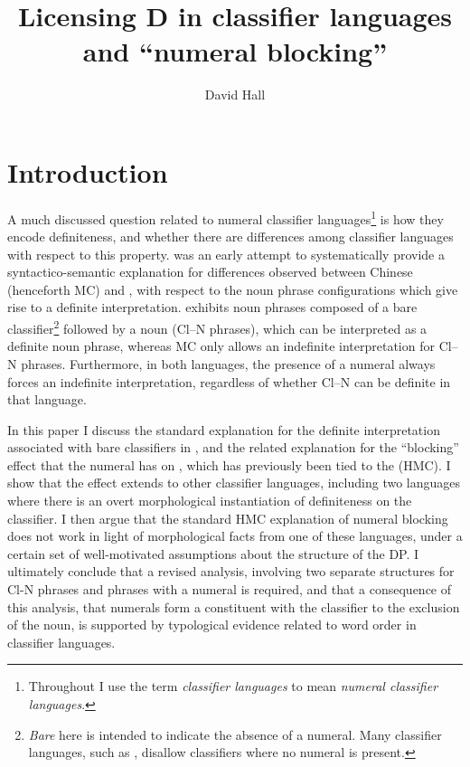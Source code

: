 \documentclass[output=paper
,modfonts
,nonflat]{langsci/langscibook}
\title{Licensing D in classifier languages and ``numeral blocking''}
\author{%
	David Hall\affiliation{Queen Mary University of London}
}
\begin{document}
\maketitle\settowidth\jamwidth{}

\section{Introduction}

A much discussed question related to numeral classifier languages\footnote{Throughout I use the term \textit{classifier languages} to mean \textit{numeral classifier languages}.} is how they encode definiteness, and whether there are differences among classifier languages with respect to this property. \citet{ChengSybesma1999} was an early attempt to systematically provide a syntactico-semantic explanation for differences observed between  Chinese (henceforth MC) and , with respect to the noun phrase configurations which give rise to a definite interpretation.  exhibits noun phrases composed of a bare classifier\footnote{\textit{Bare} here is intended to indicate the absence of a numeral. Many classifier languages, such as , disallow classifiers where no numeral is present.} followed by a noun (Cl--N phrases), which can be interpreted as a definite noun phrase, whereas MC only allows an indefinite interpretation for Cl--N phrases. Furthermore, in both languages, the presence of a numeral always forces an indefinite interpretation, regardless of whether Cl--N can be definite in that language. 

In this paper I discuss the standard explanation for the definite interpretation associated with bare classifiers in , and the related explanation for the ``blocking'' effect that the numeral has on , which has previously been tied to the  (HMC). I show that the  effect extends to other classifier languages, including two languages where there is an overt morphological instantiation of definiteness on the classifier. I then argue that the standard HMC explanation of numeral blocking does not work in light of morphological facts from one of these languages, under a certain set of well-motivated assumptions about the structure of the DP. I ultimately conclude that a revised analysis, involving two separate structures for Cl-N phrases and phrases with a numeral is required, and that a consequence of this analysis, that numerals form a constituent with the classifier to the exclusion of the noun, is supported by typological evidence related to word order in classifier languages.
\end{document}
